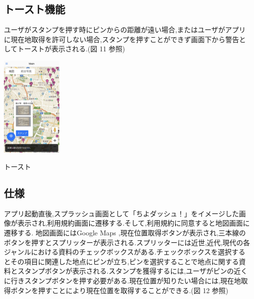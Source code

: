 \documentclass[a4paper, twoside]{jarticle}
\makeatletter
\newenvironment{figurehere}
  {\def\@captype{figure}}
  {}
\makeatother
\begin{document}
\begin{multicols}{2}
\subsection{トースト機能}
ユーザがスタンプを押す時にピンからの距離が遠い場合,またはユーザがアプリに現在地取得を許可しない場合,スタンプを押すことができず画面下から警告としてトーストが表示される.(図 11 参照)
\begin{figurehere}
\begin{center}
\includegraphics[bb=30 50 550 1300,width=3cm]{./image11.jpg}%
\end{center}
\caption{トースト}\label{fig:11}
\end{figurehere}



\subsection{仕様}
アプリ起動直後,スプラッシュ画面として「ちよダッシュ！」をイメージした画像が表示され,利用規約画面に遷移する.そして,利用規約に同意すると地図画面に遷移する.
地図画面にはGoogle Maps ,現在位置取得ボタンが表示され,三本線のボタンを押すとスプリッターが表示される.スプリッターには近世,近代,現代の各ジャンルにおける資料のチェックボックスがある.チェックボックスを選択するとその項目に関連した地点にピンが立ち,ピンを選択することで地点に関する資料とスタンプボタンが表示される.スタンプを獲得するには,ユーザがピンの近くに行きスタンプボタンを押す必要がある.現在位置が知りたい場合には,現在地取得ボタンを押すことにより現在位置を取得することができる.(図 12 参照)


\end{multicols}
\end{document}
